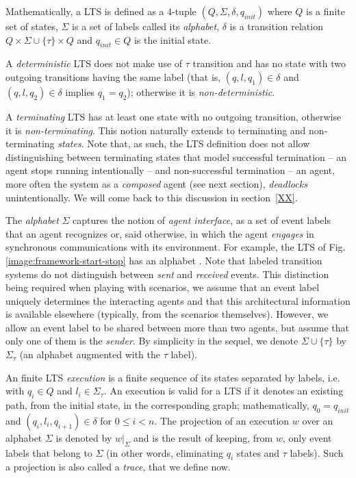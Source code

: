 Mathematically, a LTS is defined as a 4-tuple $(Q,\Sigma,\delta,q_{init})$ where $Q$ is a finite set of states, $\Sigma$ is a set of labels called its \emph{alphabet}, $\delta$ is a transition relation $Q \times \Sigma\cup\{\tau\} \times Q$ and $q_{init} \in Q$ is the initial state.

A \emph{deterministic} LTS does not make use of $\tau$ transition and has no state with two outgoing transitions having the same label (that is, $(q,l,q_1) \in \delta$ and $(q,l,q_2) \in \delta$ implies $q_1 = q_2$); otherwise it is \emph{non-deterministic}.

A \emph{terminating} LTS has at least one state with no outgoing transition, otherwise it is \emph{non-terminating}. This notion naturally extends to terminating and non-terminating \emph{states}. Note that, as such, the LTS definition does not allow distinguishing between terminating states that model successful termination -- an agent stops running intentionally -- and non-successful termination -- an agent, more often the system as a \emph{composed} agent (see next section), \emph{deadlocks} unintentionally. We will come back to this discussion in section~\ref{XX}.

The \emph{alphabet} $\Sigma$ captures the notion of \emph{agent interface}, as a set of event labels that an agent recognizes or, said otherwise, in which the agent \emph{engages} in synchronous communications with its environment. For example, the LTS of Fig.\ref{image:framework-start-stop} has an alphabet . Note that labeled transition systems do not distinguish between \emph{sent} and \emph{received} events. This distinction being required when playing with scenarios, we assume that an event label uniquely determines the interacting agents and that this architectural information is available elsewhere (typically, from the scenarios themselves). However, we allow an event label to be shared between more than two agents, but assume that only one of them is the \emph{sender}. By simplicity in the sequel, we denote $\Sigma\cup\{\tau\}$ by $\Sigma_{\tau}$ (an alphabet augmented with the $\tau$ label).

An finite LTS \emph{execution} is a finite sequence of its states separated by labels, i.e.  with $q_i \in Q$ and $l_i \in \Sigma_{\tau}$. An execution is valid for a LTS if it denotes an existing path, from the initial state, in the corresponding graph; mathematically, $q_0 = q_{init}$ and $(q_i,l_i,q_{i+1}) \in \delta$ for $0 \leq i < n$. The projection of an execution $w$ over an alphabet $\Sigma$ is denoted by $w|_{\Sigma}$ and is the result of keeping, from $w$, only event labels that belong to $\Sigma$ (in other words, eliminating $q_i$ states and $\tau$ labels). Such a projection is also called a \emph{trace}, that we define now.

